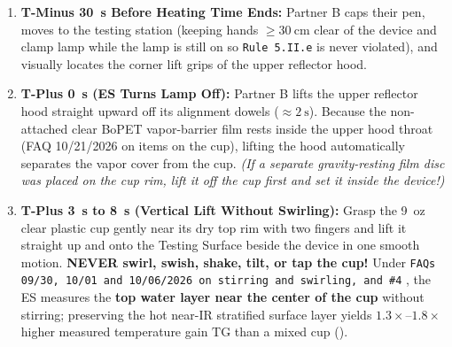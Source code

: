 \begin{devicebox}
\begin{enumerate}
  \item \textbf{T-Minus \SI{30}{\second} Before Heating Time Ends:} Partner B caps their pen, moves to the testing station (keeping hands $\ge \SI{30}{\centi\meter}$ clear of the device and clamp lamp while the lamp is still on so \texttt{Rule 5.II.e} is never violated), and visually locates the corner lift grips of the upper reflector hood.
  \item \textbf{T-Plus \SI{0}{\second} (ES Turns Lamp Off):} Partner B lifts the upper reflector hood straight upward off its alignment dowels ($\approx \SI{2}{\second}$). Because the non-attached clear BoPET vapor-barrier film rests inside the upper hood throat (FAQ 10/21/2026 on items on the cup), lifting the hood automatically separates the vapor cover from the cup. \textit{(If a separate gravity-resting film disc was placed on the cup rim, lift it off the cup first and set it inside the device!)}
  \item \textbf{T-Plus \SI{3}{\second} to \SI{8}{\second} (Vertical Lift Without Swirling):} Grasp the \SI{9}{oz} clear plastic cup gently near its dry top rim with two fingers and lift it straight up and onto the Testing Surface beside the device in one smooth motion. \textbf{NEVER swirl, swish, shake, tilt, or tap the cup!} Under \texttt{FAQs 09/30, 10/01 and 10/06/2026 on stirring and swirling, and \#4} , the ES measures the \textbf{top water layer near the center of the cup} without stirring; preserving the hot near-IR stratified surface layer yields $1.3\times\text{--}1.8\times$ higher measured temperature gain $\mathrm{TG}$ than a mixed cup ().
\end{enumerate}
\end{devicebox}

